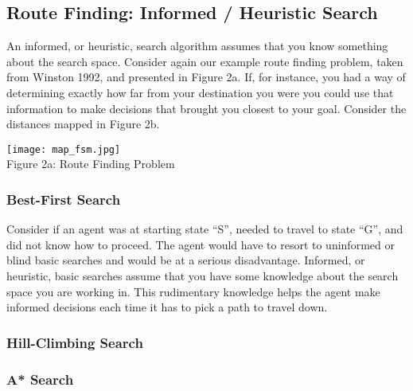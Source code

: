 \documentclass[11pt]{article}
\begin{document}
\subsection{Route Finding: Informed / Heuristic Search}
An informed, or heuristic, search algorithm assumes that you know something
about the search space.  Consider again our example route finding problem, 
taken from Winston 1992, and presented in Figure 2a.  If, for instance, you had a
way of determining exactly how far from your destination you were you could use
that information to make decisions that brought you closest to your goal.
Consider the distances mapped in Figure 2b.

\begin{center}
\texttt{[image: map\_fsm.jpg]}\\
Figure 2a: Route Finding Problem
\cite{winston1992}
\end{center}

\subsubsection{Best-First Search}
Consider if an agent was at starting state ``S'', needed to travel to state
``G'', and did not know how to proceed.  The agent would have to resort to
uninformed or blind basic searches and would be at a serious disadvantage. 
Informed, or heuristic, basic searches assume that you have some knowledge about
the search space you are working in.  This rudimentary knowledge helps the agent
make informed decisions each time it has to pick a path to travel down.

\subsubsection{Hill-Climbing Search}


\subsubsection{A* Search}


\newpage



\end{document}
